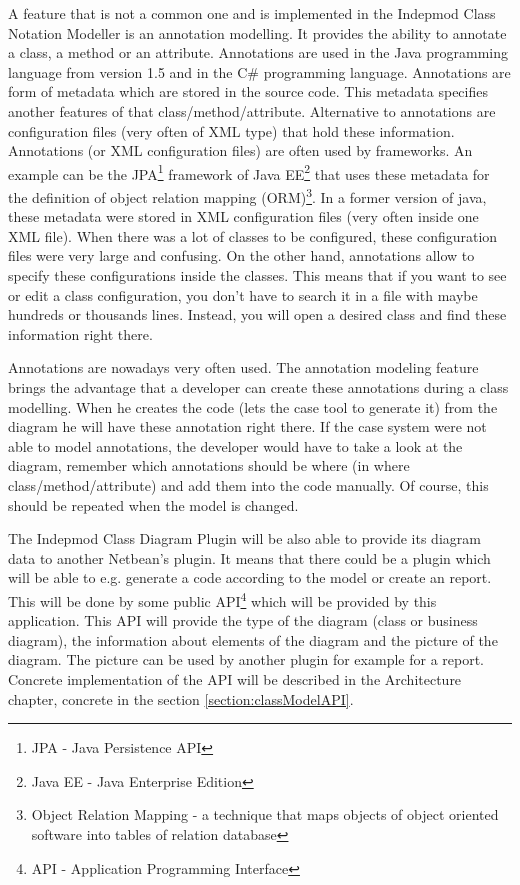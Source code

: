 A feature that is not a common one and is implemented in the Indepmod Class Notation Modeller is an annotation modelling. It provides the ability to annotate a class, a method or an attribute. Annotations are used in the Java programming language from version 1.5 and in the C\# programming language. Annotations are form of metadata which are stored in the source code. This metadata specifies another features of that class/method/attribute. Alternative to annotations are configuration files (very often of XML type) that hold these information. Annotations (or XML configuration files) are often used by frameworks. An example can be the JPA\footnote{JPA - Java Persistence API} framework of Java EE\footnote{Java EE - Java Enterprise Edition} that uses these metadata for the definition of object relation mapping (ORM)\footnote{Object Relation Mapping - a technique that maps objects of object oriented software into tables of relation database}. In a former version of java, these metadata were stored in XML configuration files (very often inside one XML file). When there was a lot of classes to be configured, these configuration files were very large and confusing. On the other hand, annotations allow to specify these configurations inside the classes. This means that if you want to see or edit a class configuration, you don't have to search it in a file with maybe hundreds or thousands lines. Instead, you will open a desired class and find these information right there.

Annotations are nowadays very often used. The annotation modeling feature brings the advantage that a developer can create these annotations during a class modelling. When he creates the code (lets the case tool to generate it) from the diagram he will have these annotation right there. If the case system were not able to model annotations, the developer would have to take a look at the diagram, remember which annotations should be where (in where class/method/attribute) and add them into the code manually. Of course, this should be repeated when the model is changed.

The Indepmod Class Diagram Plugin will be also able to provide its diagram data to another Netbean's plugin. It means that there could be a plugin which will be able to e.g. generate a code according to the model or create an report. This will be done by some public API\footnote{API - Application Programming Interface} which will be provided by this application. This API will provide the type of the diagram (class or business diagram), the information about elements of the diagram and the picture of the diagram. The picture can be used by another plugin for example for a report. Concrete implementation of the API will be described in the Architecture chapter, concrete in the section \ref{section:classModelAPI}.

